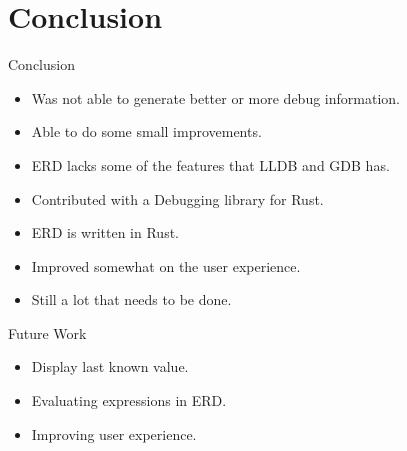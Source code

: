 \section{Conclusion}

\begin{frame}{Conclusion}
    \begin{itemize}
	\item Was not able to generate better or more debug information.
        \item Able to do some small improvements.
        \item ERD lacks some of the features that LLDB and GDB has.
        \item Contributed with a Debugging library for Rust.
        \item ERD is written in Rust.
        \item Improved somewhat on the user experience.
        \item Still a lot that needs to be done.
    \end{itemize}
\end{frame}


\begin{frame}{Future Work}
    \begin{itemize}
        \item Display last known value.
        \item Evaluating expressions in ERD.
	\item Improving user experience.
    \end{itemize}
\end{frame}


